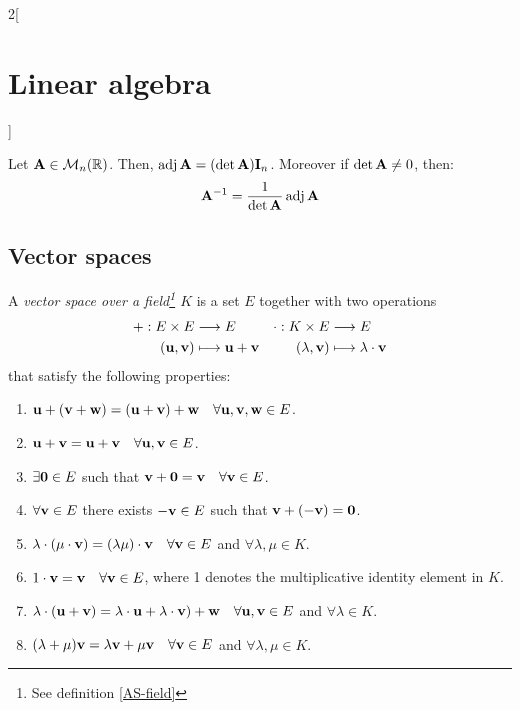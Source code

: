 \documentclass[../../../main.tex]{subfiles}
\begin{document}
\begin{multicols}{2}[\section{Linear algebra}]
\begin{definition}
\end{definition}
\begin{theorem}
    Let $\vb{A}\in\mathcal{M}_n(\mathbb{R})$. Then, $\operatorname{adj}\vb{A}=(\det \vb{A})\vb{I}_n$. Moreover if $\det \vb{A}\ne 0$, then: $$\vb{A}^{-1}=\frac{1}{\det \vb{A}}\operatorname{adj}\vb{A}$$
\end{theorem}
\subsection{Vector spaces}
\begin{definition}
    A \textit{vector space over a field\footnote{See definition \ref{AS-field}} $K$} is a set $E$ together with two operations
    \begin{align*}
        +:E\times E&\longrightarrow E&\cdot:K\times E&\longrightarrow E\\
        (\vb{u},\vb{v})&\longmapsto \vb{u}+ \vb{v}&(\lambda,\vb{v})&\longmapsto \lambda\cdot \vb{v}
    \end{align*}
    that satisfy the following properties:
    \begin{enumerate}
        \item $\vb{u}+(\vb{v}+\vb{w})=(\vb{u}+\vb{v})+\vb{w}\quad\forall\vb{u},\vb{v},\vb{w}\in E$.
        \item $\vb{u}+\vb{v}=\vb{u}+\vb{v}\quad\forall\vb{u},\vb{v}\in E$.
        \item $\exists\vb{0}\in E$ such that $\vb{v}+\vb{0}=\vb{v}\quad\forall\vb{v}\in E$.
        \item $\forall\vb{v}\in E$ there exists $-\vb{v}\in E$ such that $\vb{v}+(-\vb{v})=\vb{0}$.                  
        \item $\lambda\cdot(\mu\cdot\vb{v})=(\lambda\mu)\cdot\vb{v}\quad\forall\vb{v}\in E$ and $\forall\lambda,\mu\in K$. 
        \item $1\cdot\vb{v}=\vb{v}\quad\forall\vb{v}\in E$, where 1 denotes the multiplicative identity element in $K$.
        \item $\lambda\cdot(\vb{u}+\vb{v})=\lambda\cdot\vb{u}+\lambda\cdot\vb{v})+\vb{w}\quad\forall\vb{u},\vb{v}\in E$ and $\forall\lambda\in K$.
        \item $(\lambda+\mu)\vb{v}=\lambda\vb{v}+\mu\vb{v}\quad\forall\vb{v}\in E$ and $\forall\lambda,\mu\in K$.

\end{enumerate}
\end{definition}
\end{multicols}
\end{document}
